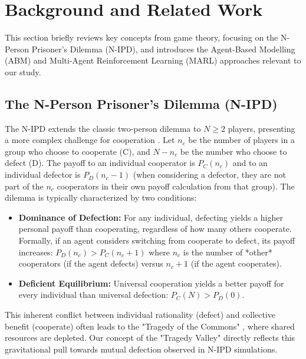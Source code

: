 \documentclass[]{llncs} %
\begin{document}
\section{Background and Related Work}
\label{sec:background} %

This section briefly reviews key concepts from game theory, focusing on the N-Person Prisoner's Dilemma (N-IPD), and introduces the Agent-Based Modelling (ABM) and Multi-Agent Reinforcement Learning (MARL) approaches relevant to our study. 

\subsection{The N-Person Prisoner's Dilemma (N-IPD)}
The N-IPD extends the classic two-person dilemma to $N \ge 2$ players, presenting a more complex challenge for cooperation \cite{Hamburger1973, Hardin1971}. 
Let $n_c$ be the number of players in a group who choose to cooperate (C), and $N-n_c$ be the number who choose to defect (D). The payoff to an individual cooperator is $P_C(n_c)$ and to an individual defector is $P_D(n_c-1)$ (when considering a defector, they are not part of the $n_c$ cooperators in their own payoff calculation from that group). The dilemma is typically characterized by two conditions:
\begin{itemize}
    \item \textbf{Dominance of Defection:} For any individual, defecting yields a higher personal payoff than cooperating, regardless of how many others cooperate. Formally, if an agent considers switching from cooperate to defect, its payoff increases: $P_D(n_c) > P_C(n_c+1)$ where $n_c$ is the number of *other* cooperators (if the agent defects) versus $n_c+1$ (if the agent cooperates).
    \item \textbf{Deficient Equilibrium:} Universal cooperation yields a better payoff for every individual than universal defection: $P_C(N) > P_D(0)$.
\end{itemize}
This inherent conflict between individual rationality (defect) and collective benefit (cooperate) often leads to the "Tragedy of the Commons" \cite{Hardin1968}, where shared resources are depleted. Our concept of the "Tragedy Valley" directly reflects this gravitational pull towards mutual defection observed in N-IPD simulations.
\end{document}
